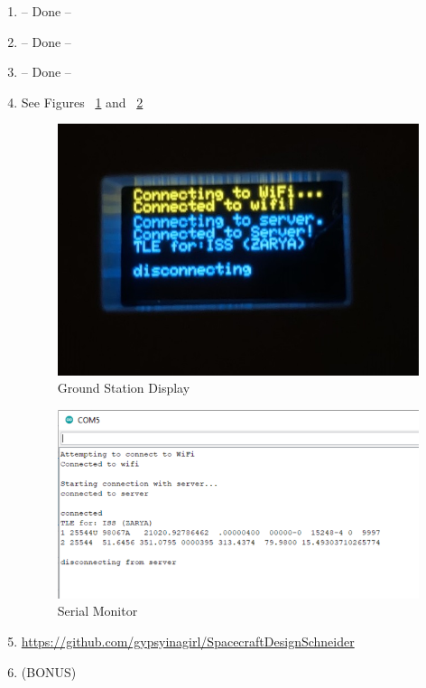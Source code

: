 \documentclass{article}
\begin{document}
\begin{enumerate}[label=(\alph*)]
\begin{enumerate}[label=(\roman*)]
		\item -- Done --
		\item -- Done --
		\item -- Done --
		\item See Figures ~\ref{OD01} and ~\ref{SM}\\
		\begin{figure}[H]
			\centering
			\includegraphics[width=5in]{images/OD01_Display.jpg}
			\caption{Ground Station Display}
			\label{OD01}
		\end{figure}
	    \begin{figure}[H]
		    \centering
			\includegraphics[width=5in]{images/SerialMonitor.png}
			\caption{Serial Monitor}
			\label{SM}
		\end{figure}
		\item \url{https://github.com/gypsyinagirl/SpacecraftDesignSchneider}
		\item (BONUS)
	\end{enumerate}
\end{enumerate}
\newpage
\end{document}
